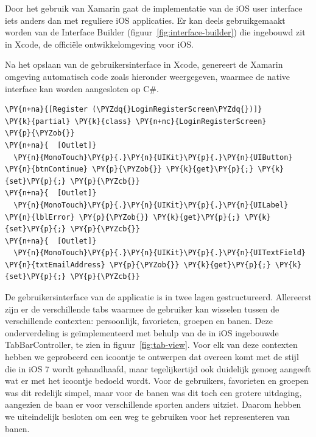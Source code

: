 Door het gebruik van Xamarin gaat de implementatie van de iOS user interface iets anders dan met reguliere iOS applicaties. Er kan deels gebruikgemaakt worden van de Interface Builder (figuur~\ref{fig:interface-builder}) die ingebouwd zit in Xcode, de officiële ontwikkelomgeving voor iOS.

Na het opslaan van de gebruikersinterface in Xcode, genereert de Xamarin omgeving automatisch code zoals hieronder weergegeven, waarmee de native interface kan worden aangesloten op C\#.



\begin{Verbatim}[commandchars=\\\{\}]
\PY{n+na}{[Register (\PYZdq{}LoginRegisterScreen\PYZdq{})]}
\PY{k}{partial} \PY{k}{class} \PY{n+nc}{LoginRegisterScreen}
\PY{p}{\PYZob{}}
\PY{n+na}{  [Outlet]}
  \PY{n}{MonoTouch}\PY{p}{.}\PY{n}{UIKit}\PY{p}{.}\PY{n}{UIButton} \PY{n}{btnContinue} \PY{p}{\PYZob{}} \PY{k}{get}\PY{p}{;} \PY{k}{set}\PY{p}{;} \PY{p}{\PYZcb{}}
\PY{n+na}{  [Outlet]}
  \PY{n}{MonoTouch}\PY{p}{.}\PY{n}{UIKit}\PY{p}{.}\PY{n}{UILabel} \PY{n}{lblError} \PY{p}{\PYZob{}} \PY{k}{get}\PY{p}{;} \PY{k}{set}\PY{p}{;} \PY{p}{\PYZcb{}}
\PY{n+na}{  [Outlet]}
  \PY{n}{MonoTouch}\PY{p}{.}\PY{n}{UIKit}\PY{p}{.}\PY{n}{UITextField} \PY{n}{txtEmailAddress} \PY{p}{\PYZob{}} \PY{k}{get}\PY{p}{;} \PY{k}{set}\PY{p}{;} \PY{p}{\PYZcb{}}
\end{Verbatim}

De gebruikersinterface van de applicatie is in twee lagen gestructureerd. Allereerst zijn er de verschillende tabs waarmee de gebruiker kan wisselen tussen de verschillende contexten: persoonlijk, favorieten, groepen en banen. Deze onderverdeling is geïmplementeerd met behulp van de in iOS ingebouwde TabBarController, te zien in figuur~\ref{fig:tab-view}. Voor elk van deze contexten hebben we geprobeerd een icoontje te ontwerpen dat overeen komt met de stijl die in iOS 7 wordt gehandhaafd, maar tegelijkertijd ook duidelijk genoeg aangeeft wat er met het icoontje bedoeld wordt. Voor de gebruikers, favorieten en groepen was dit redelijk simpel, maar voor de banen was dit toch een grotere uitdaging, aangezien de baan er voor verschillende sporten anders uitziet. Daarom hebben we uiteindelijk besloten om een weg te gebruiken voor het representeren van banen.

